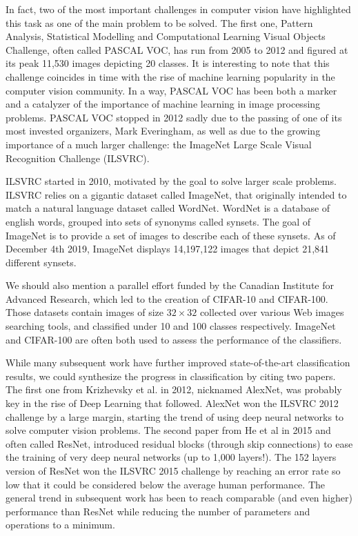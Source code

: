In fact, two of the most important challenges in computer vision have highlighted this task as one of the main problem to be solved. The first one, Pattern Analysis, Statistical Modelling and Computational Learning Visual Objects Challenge, often called PASCAL VOC, has run from 2005 to 2012 and figured at its peak 11,530 images depicting 20 classes. It is interesting to note that this challenge coincides in time with the rise of machine learning popularity in the computer vision community. In a way, PASCAL VOC has been both a marker and a catalyzer of the importance of machine learning in image processing problems. PASCAL VOC stopped in 2012 sadly due to the passing of one of its most invested organizers, Mark Everingham, as well as due to the growing importance of a much larger challenge: the ImageNet Large Scale Visual Recognition Challenge (ILSVRC).

ILSVRC started in 2010, motivated by the goal to solve larger scale problems. ILSVRC relies on a gigantic dataset called ImageNet, that originally intended to match a natural language dataset called WordNet. WordNet is a database of english words, grouped into sets of synonyms called synsets. The goal of ImageNet is to provide a set of images to describe each of these synsets. As of December 4th 2019, ImageNet displays 14,197,122 images that depict 21,841 different synsets.

We should also mention a parallel effort funded by the Canadian Institute for Advanced Research, which led to the creation of CIFAR-10 and CIFAR-100. Those datasets contain images of size $32 \times 32$ collected over various Web images searching tools, and classified under 10 and 100 classes respectively. ImageNet and CIFAR-100 are often both used to assess the performance of the classifiers.

While many subsequent work have further improved state-of-the-art classification results, we could synthesize the progress in classification by citing two papers. The first one from Krizhevsky et al. in 2012, nicknamed AlexNet, was probably key in the rise of Deep Learning that followed. AlexNet won the ILSVRC 2012 challenge by a large margin, starting the trend of using deep neural networks to solve computer vision problems. The second paper from He et al in 2015 and often called ResNet, introduced residual blocks (through skip connections) to ease the training of very deep neural networks (up to 1,000 layers!). The 152 layers version of ResNet won the ILSVRC 2015 challenge by reaching an error rate so low that it could be considered below the average human performance. The general trend in subsequent work has been to reach comparable (and even higher) performance than ResNet while reducing the number of parameters and operations to a minimum.  

